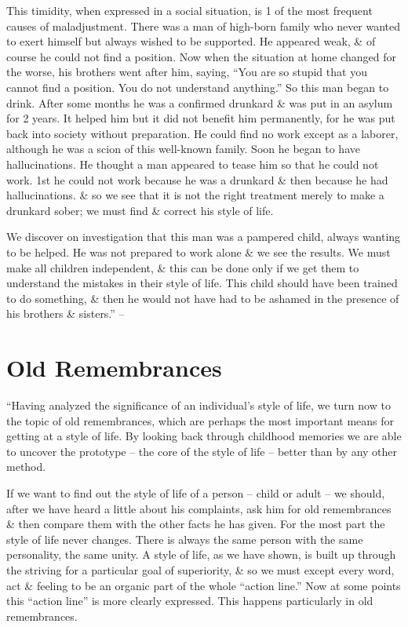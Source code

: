 \documentclass{article}
\numberwithin{equation}{section}
\begin{document}
This timidity, when expressed in a social situation, is 1 of the most frequent causes of maladjustment. There was a man of high-born family who never wanted to exert himself but always wished to be supported. He appeared weak, \& of course he could not find a position. Now when the situation at home changed for the worse, his brothers went after him, saying, ``You are so stupid that you cannot find a position. You do not understand anything.'' So this man began to drink. After some months he was a confirmed drunkard \& was put in an asylum for 2 years. It helped him but it did not benefit him permanently, for he was put back into society without preparation. He could find no work except as a laborer, although he was a scion of this well-known family. Soon he began to have hallucinations. He thought a man appeared to tease him so that he could not work. 1st he could not work because he was a drunkard \& then because he had hallucinations. \& so we see that it is not the right treatment merely to make a drunkard sober; we must find \& correct his style of life.

We discover on investigation that this man was a pampered child, always wanting to be helped. He was not prepared to work alone \& we see the results. We must make all children independent, \& this can be done only if we get them to understand the mistakes in their style of life. This child should have been trained to do something, \& then he would not have had to be ashamed in the presence of his brothers \& sisters.'' -- \cite[pp. 98--116]{Adler2013}


\section{Old Remembrances}
``Having analyzed the significance of an individual's style of life, we turn now to the topic of old remembrances, which are perhaps the most important means for getting at a style of life. By looking back through childhood memories we are able to uncover the prototype -- the core of the style of life -- better than by any other method.

If we want to find out the style of life of a person -- child or adult -- we should, after we have heard a little about his complaints, ask him for old remembrances \& then compare them with the other facts he has given. For the most part the style of life never changes. There is always the same person with the same personality, the same unity. A style of life, as we have shown, is built up through the striving for a particular goal of superiority, \& so we must except every word, act \& feeling to be an organic part of the whole ``action line.'' Now at some points this ``action line'' is more clearly expressed. This happens particularly in old remembrances.
\end{document}
